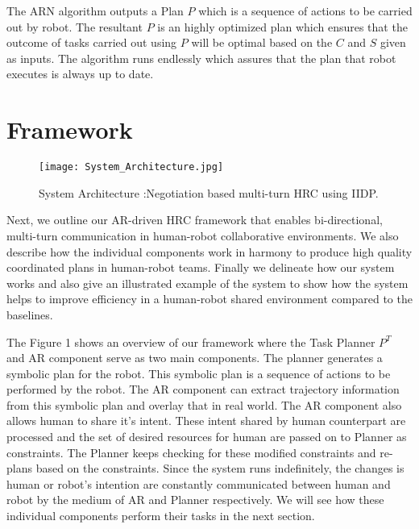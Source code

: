 \documentclass{article}
\begin{document}
The ARN algorithm outputs a Plan $P$ which is a sequence of actions to be carried out by robot. The resultant $P$ is an highly optimized plan which ensures that the outcome of tasks carried out using $P$ will be optimal based on the $C$ and $S$ given as inputs. The algorithm runs endlessly which assures that the plan that robot executes is always up to date. 

\section{Framework}

\begin{figure}[H]
  \begin{center}
    \vspace{.5em}
    \texttt{[image: System\_Architecture.jpg]}
    \vspace{-.5em}
    \caption{System Architecture :Negotiation based multi-turn HRC using IIDP. }
    \label{fig:system_arch}
  \end{center}
  \vspace{-1.5em}
\end{figure}

Next, we outline our AR-driven HRC framework that enables bi-directional, multi-turn communication in human-robot collaborative environments. We also describe how the individual components work in harmony to produce high quality coordinated plans in human-robot teams. Finally we delineate how our system works and also give an illustrated example of the system to show how the system helps to improve efficiency in a human-robot shared environment compared to the baselines.

The Figure 1 shows an overview of our framework where the Task Planner $P^{T}$ and AR component serve as two main components. The planner generates a symbolic plan for the robot. This symbolic plan is a sequence of actions to be performed by the robot. The AR component can extract trajectory information from this symbolic plan and overlay that in real world. The AR component also allows human to share it's intent. These intent shared by human counterpart are processed and the set of desired resources for human are passed on to Planner as constraints. The Planner keeps checking for these modified constraints and re-plans based on the constraints. Since the system runs indefinitely, the changes is human or robot's intention are constantly communicated between human and robot by the medium of AR and Planner respectively. We will see how these individual components perform their tasks in the next section.
\end{document}
